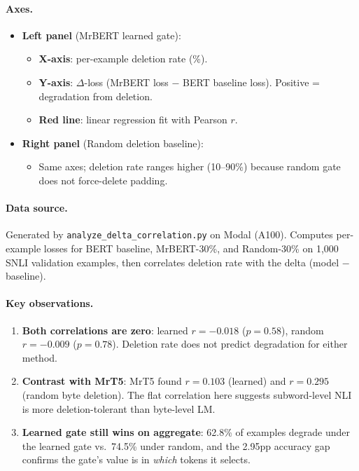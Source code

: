 \documentclass{article} %
\begin{document}
\paragraph{Axes.}
\begin{itemize}[nosep]
    \item \textbf{Left panel} (MrBERT learned gate):
    \begin{itemize}[nosep]
        \item \textbf{X-axis}: per-example deletion rate (\%).
        \item \textbf{Y-axis}: $\Delta$-loss (MrBERT loss $-$ BERT baseline loss). Positive = degradation from deletion.
        \item \textbf{Red line}: linear regression fit with Pearson $r$.
    \end{itemize}
    \item \textbf{Right panel} (Random deletion baseline):
    \begin{itemize}[nosep]
        \item Same axes; deletion rate ranges higher (10--90\%) because random gate does not force-delete padding.
    \end{itemize}
\end{itemize}

\paragraph{Data source.}
Generated by \texttt{analyze\_delta\_correlation.py} on Modal (A100). Computes per-example losses for BERT baseline, MrBERT-30\%, and Random-30\% on 1,000 SNLI validation examples, then correlates deletion rate with the delta (model $-$ baseline).

\paragraph{Key observations.}
\begin{enumerate}[nosep]
    \item \textbf{Both correlations are zero}: learned $r=-0.018$ ($p=0.58$), random $r=-0.009$ ($p=0.78$). Deletion rate does not predict degradation for either method.
    \item \textbf{Contrast with MrT5}: MrT5 found $r=0.103$ (learned) and $r=0.295$ (random byte deletion). The flat correlation here suggests subword-level NLI is more deletion-tolerant than byte-level LM.
    \item \textbf{Learned gate still wins on aggregate}: 62.8\% of examples degrade under the learned gate vs.\ 74.5\% under random, and the 2.95pp accuracy gap confirms the gate's value is in \emph{which} tokens it selects.
\end{enumerate}
\end{document}
